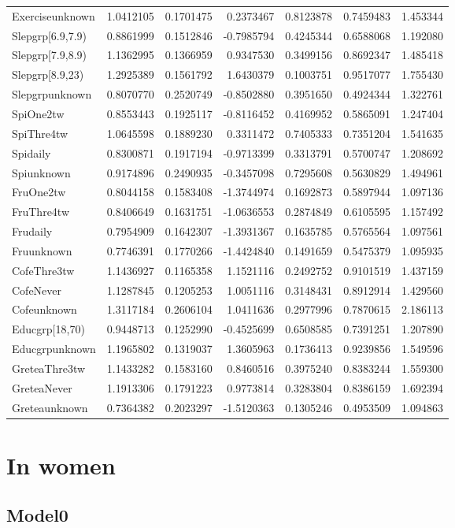 \documentclass[]{article}
\begin{document}
\begin{longtable}[]{@{}lrrrrrr@{}}
Exerciseunknown & 1.0412105 & 0.1701475 & 0.2373467 & 0.8123878 &
0.7459483 & 1.453344\tabularnewline
Slepgrp{[}6.9,7.9) & 0.8861999 & 0.1512846 & -0.7985794 & 0.4245344 &
0.6588068 & 1.192080\tabularnewline
Slepgrp{[}7.9,8.9) & 1.1362995 & 0.1366959 & 0.9347530 & 0.3499156 &
0.8692347 & 1.485418\tabularnewline
Slepgrp{[}8.9,23) & 1.2925389 & 0.1561792 & 1.6430379 & 0.1003751 &
0.9517077 & 1.755430\tabularnewline
Slepgrpunknown & 0.8070770 & 0.2520749 & -0.8502880 & 0.3951650 &
0.4924344 & 1.322761\tabularnewline
SpiOne2tw & 0.8553443 & 0.1925117 & -0.8116452 & 0.4169952 & 0.5865091 &
1.247404\tabularnewline
SpiThre4tw & 1.0645598 & 0.1889230 & 0.3311472 & 0.7405333 & 0.7351204 &
1.541635\tabularnewline
Spidaily & 0.8300871 & 0.1917194 & -0.9713399 & 0.3313791 & 0.5700747 &
1.208692\tabularnewline
Spiunknown & 0.9174896 & 0.2490935 & -0.3457098 & 0.7295608 & 0.5630829
& 1.494961\tabularnewline
FruOne2tw & 0.8044158 & 0.1583408 & -1.3744974 & 0.1692873 & 0.5897944 &
1.097136\tabularnewline
FruThre4tw & 0.8406649 & 0.1631751 & -1.0636553 & 0.2874849 & 0.6105595
& 1.157492\tabularnewline
Frudaily & 0.7954909 & 0.1642307 & -1.3931367 & 0.1635785 & 0.5765564 &
1.097561\tabularnewline
Fruunknown & 0.7746391 & 0.1770266 & -1.4424840 & 0.1491659 & 0.5475379
& 1.095935\tabularnewline
CofeThre3tw & 1.1436927 & 0.1165358 & 1.1521116 & 0.2492752 & 0.9101519
& 1.437159\tabularnewline
CofeNever & 1.1287845 & 0.1205253 & 1.0051116 & 0.3148431 & 0.8912914 &
1.429560\tabularnewline
Cofeunknown & 1.3117184 & 0.2606104 & 1.0411636 & 0.2977996 & 0.7870615
& 2.186113\tabularnewline
Educgrp{[}18,70) & 0.9448713 & 0.1252990 & -0.4525699 & 0.6508585 &
0.7391251 & 1.207890\tabularnewline
Educgrpunknown & 1.1965802 & 0.1319037 & 1.3605963 & 0.1736413 &
0.9239856 & 1.549596\tabularnewline
GreteaThre3tw & 1.1433282 & 0.1583160 & 0.8460516 & 0.3975240 &
0.8383244 & 1.559300\tabularnewline
GreteaNever & 1.1913306 & 0.1791223 & 0.9773814 & 0.3283804 & 0.8386159
& 1.692394\tabularnewline
Greteaunknown & 0.7364382 & 0.2023297 & -1.5120363 & 0.1305246 &
0.4953509 & 1.094863\tabularnewline
\bottomrule
\end{longtable}

\hypertarget{in-women-4}{%
\section{In women}\label{in-women-4}}

\hypertarget{model0-9}{%
\subsection{Model0}\label{model0-9}}
\end{document}
